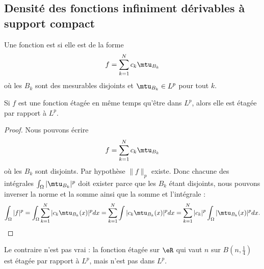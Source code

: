 \subsection{Densité des fonctions infiniment dérivables à support compact}

\begin{definition}
    Une fonction est  si elle est de la forme
    \begin{equation}
        f=\sum_{k=1}^Nc_k\mtu_{B_k}
    \end{equation}
    où les \( B_k\) sont des mesurables disjoints et \( \mtu_{B_k}\in L^p\) pour tout \( k\).
\end{definition}

\begin{lemma}   \label{LemWHIRdaX}
    Si \( f\) est une fonction étagée en même temps qu'être dans \( L^p\), alors elle est étagée par rapport à \( L^p\).
\end{lemma}

\begin{proof}
    Nous pouvons écrire
    \begin{equation}
        f=\sum_{k=1}^Nc_k\mtu_{B_k}
    \end{equation}
    où les \( B_k\) sont disjoints. Par hypothèse \( \| f \|_p\) existe. Donc chacune des intégrales \( \int_{\Omega}| \mtu_{B_k} |^p\) doit exister parce que les \( B_k\) étant disjoints, nous pouvons inverser la norme et la somme ainsi que la somme et l'intégrale :
    \begin{equation}
        \int_{\Omega}|f|^p=\int_{\Omega}\sum_{k=1}^N| c_k\mtu_{B_k}(x) |^pdx=\sum_{k=1}^N\int| c_k\mtu_{B_k}(x) |^pdx=\sum_{k=1}^N| c_k |^p\int_{\Omega}| \mtu_{B_k}(x) |^pdx.
    \end{equation}
\end{proof}
Le contraire n'est pas vrai : la fonction étagée sur \( \eR\) qui vaut \( n\) sur \( B(n,\frac{1}{ 4 })\) est étagée par rapport à \( L^p\), mais n'est pas dans \( L^p\).

